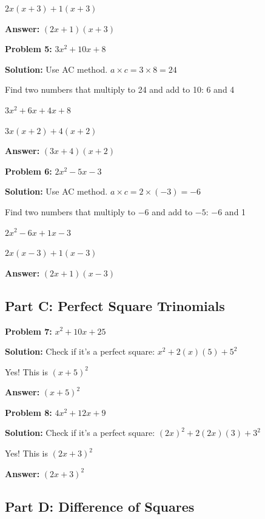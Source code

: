 \documentclass[12pt]{article}
\begin{document}
		$2x(x + 3) + 1(x + 3)$
		
		\textbf{Answer:} $(2x + 1)(x + 3)$

		\vspace{0.5cm}

		\textbf{Problem 5:} $3x^2 + 10x + 8$
		
		\textbf{Solution:} Use AC method. $a \times c = 3 \times 8 = 24$
		
		Find two numbers that multiply to 24 and add to 10: 6 and 4
		
		$3x^2 + 6x + 4x + 8$
		
		$3x(x + 2) + 4(x + 2)$
		
		\textbf{Answer:} $(3x + 4)(x + 2)$

		\vspace{0.5cm}

		\textbf{Problem 6:} $2x^2 - 5x - 3$
		
		\textbf{Solution:} Use AC method. $a \times c = 2 \times (-3) = -6$
		
		Find two numbers that multiply to $-6$ and add to $-5$: $-6$ and 1
		
		$2x^2 - 6x + 1x - 3$
		
		$2x(x - 3) + 1(x - 3)$
		
		\textbf{Answer:} $(2x + 1)(x - 3)$

	\newpage

	\subsection*{Part C: Perfect Square Trinomials}

		\textbf{Problem 7:} $x^2 + 10x + 25$
		
		\textbf{Solution:} Check if it's a perfect square: $x^2 + 2(x)(5) + 5^2$
		
		Yes! This is $(x + 5)^2$
		
		\textbf{Answer:} $(x + 5)^2$

		\vspace{0.5cm}

		\textbf{Problem 8:} $4x^2 + 12x + 9$
		
		\textbf{Solution:} Check if it's a perfect square: $(2x)^2 + 2(2x)(3) + 3^2$
		
		Yes! This is $(2x + 3)^2$
		
		\textbf{Answer:} $(2x + 3)^2$

	\subsection*{Part D: Difference of Squares}
\end{document}
